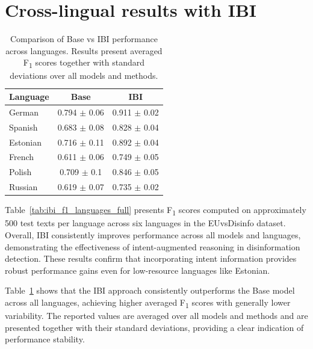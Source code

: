 \documentclass[11pt]{article}
\begin{document}
\section{Cross-lingual results with IBI}
\label{appendix:cross-lingual-res-ibi} 

\begin{table}[h!]
\centering
\scriptsize
\renewcommand{\arraystretch}{1.1}
\begin{tabular}{lcc}
\hline
\textbf{Language} & \textbf{Base} & \textbf{IBI} \\
\hline
German   & 0.794 $\pm$ 0.06 & 0.911 $\pm$ 0.02 \\
Spanish  & 0.683 $\pm$ 0.08 & 0.828 $\pm$ 0.04\\
Estonian & 0.716 $\pm$ 0.11 & 0.892 $\pm$ 0.04\\
French   & 0.611 $\pm$ 0.06& 0.749 $\pm$ 0.05\\
Polish   & 0.709 $\pm$ 0.1 & 0.846 $\pm$ 0.05\\
Russian  & 0.619 $\pm$ 0.07 & 0.735 $\pm$ 0.02\\
\hline
\end{tabular}
\caption{Comparison of Base vs IBI performance across languages. Results present averaged F\textsubscript{1} scores together with standard deviations over all models and methods.}
\label{tab:ibi_vs_base_per_language_avg_std}
\end{table}

Table~\ref{tab:ibi_f1_languages_full} presents F\textsubscript{1} scores computed on approximately 500 test texts per language across six languages in the EUvsDisinfo dataset. Overall, IBI consistently improves performance across all models and languages, demonstrating the effectiveness of intent-augmented reasoning in disinformation detection. These results confirm that incorporating intent information provides robust performance gains even for low-resource languages like Estonian.

Table~\ref{tab:ibi_vs_base_per_language_avg_std} shows that the IBI approach consistently outperforms the Base model across all languages, achieving higher averaged F\textsubscript{1} scores with generally lower variability. The reported values are averaged over all models and methods and are presented together with their standard deviations, providing a clear indication of performance stability.
\end{document}
